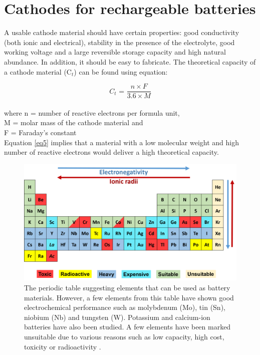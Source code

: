 \section{Cathodes for rechargeable batteries}
A usable cathode material should have certain properties: good conductivity (both ionic and electrical), stability in the presence of the electrolyte, good working voltage and a large reversible storage capacity and high natural abundance. In addition, it should be easy to fabricate. The theoretical capacity of a cathode material (C$_{t}$) can be found using equation:

\begin{equation} \label{eq5}
   C_{t} \text{ = } \frac{n \times F}{3.6 \times M}
\end{equation}\\
where n = number of reactive electrons per formula unit,\\
M = molar mass of the cathode material and\\
F = Faraday's constant\\
Equation \ref{eq5} implies that a material with a low molecular weight and high number of reactive electrons would deliver a high theoretical capacity.

\begin{figure}[h!]
\centering
\includegraphics[width=\textwidth]{Figures/chap1fig/pt}
\caption{The periodic table suggesting elements that can be used as battery materials. However, a few elements from this table have shown good electrochemical performance such as molybdenum (Mo), tin (Sn), niobium (Nb) and tungsten (W). Potassium and calcium-ion batteries have also been studied. A few elements have been marked unsuitable due to various reasons such as low capacity, high cost, toxicity or radioactivity \cite{liu_understanding_2016}.}
\label{Figures/chap1fig:pt}
\end{figure}

